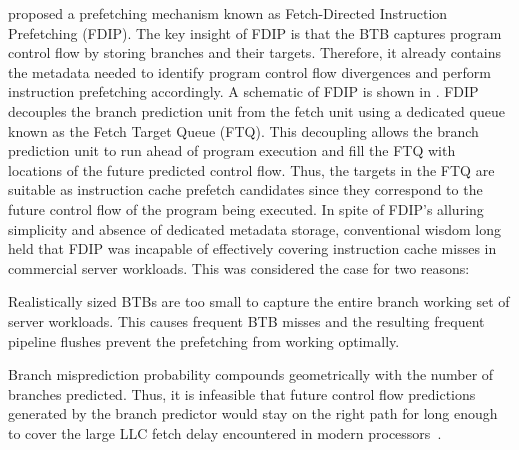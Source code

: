 \documentclass[../main.tex]{subfiles}
\begin{document}
\begin{refsection}
\textcite{reinman99_fetch_direc_instr_prefet} proposed a prefetching
mechanism known as Fetch-Directed Instruction Prefetching (FDIP). The
key insight of FDIP is that the BTB captures program control flow by
storing branches and their targets. Therefore, it already contains the
metadata needed to identify program control flow divergences and
perform instruction prefetching accordingly. A schematic of FDIP is
shown in . FDIP decouples the branch prediction unit
from the fetch unit using a dedicated queue known as the Fetch Target
Queue (FTQ). This decoupling allows the branch prediction unit to run
ahead of program execution and fill the FTQ with locations of the
future predicted control flow. Thus, the targets in the FTQ are
suitable as instruction cache prefetch candidates since they
correspond to the future control flow of the program being
executed. In spite of FDIP's alluring simplicity and absence of
dedicated metadata storage, conventional wisdom long held that FDIP
was incapable of effectively covering instruction cache misses in
commercial server workloads. This was considered the case for two
reasons: \begin{inparaenum}[1)] \item Realistically sized BTBs are too
  small to capture the entire branch working set of server
  workloads. This causes frequent BTB misses and the resulting
  frequent pipeline flushes prevent the prefetching from working
  optimally. \item Branch misprediction probability compounds geometrically with
  the number of branches predicted. Thus, it is infeasible that future
  control flow predictions generated by the branch predictor would stay on the right path for long enough to cover the large LLC fetch delay encountered in modern processors~\cite{ferdman08_tempor}.
\end{inparaenum}



\end{refsection}
\end{document}
